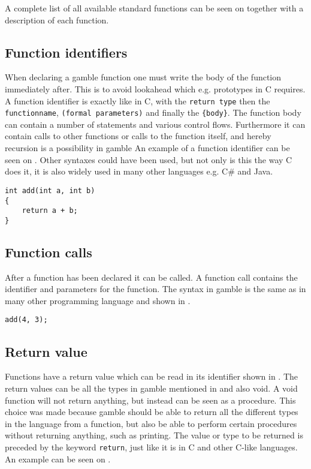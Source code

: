A complete list of all available standard functions can be seen on  together with a description of each function.


\subsection*{Function identifiers}
When declaring a \gls{gamble} function one must write the body of the function immediately after.
This is to avoid lookahead which e.g. prototypes in C requires.
A function identifier is exactly like in C, with the \texttt{return type} then the \texttt{functionname}, \texttt{(formal parameters)} and finally the \texttt{\{body\}}. %
The function body can contain a number of statements and various control flows.
Furthermore it can contain calls to other functions or calls to the function itself, and hereby recursion is a possibility in \gls{gamble}
An example of a function identifier can be seen on .
Other syntaxes could have been used, but not only is this the way C does it, it is also widely used in many other languages e.g. C\# and Java.

\begin{lstlisting}[caption={Function Identifier},label={lst:functionID},numbers=none]                                                        
int add(int a, int b)
{
    return a + b;
}
\end{lstlisting}

\subsection*{Function calls}
After a function has been declared it can be called. 
A function call contains the identifier and parameters for the function. 
The syntax in \gls{gamble} is the same as in many other programming language and shown in . 

\begin{lstlisting}[caption={A function call in \gls{gamble}},label={lst:functionCall},numbers=none]
add(4, 3);
\end{lstlisting}


\subsection*{Return value}
Functions have a return value which can be read in its identifier shown in .
The return values can be all the types in \gls{gamble} mentioned in  and also void. 
A void function will not return anything, but instead can be seen as a procedure.
This choice was made because \gls{gamble} should be able to return all the different types in the language from a function, but also be able to perform certain procedures without returning anything, such as printing.
The value or type to be returned is preceded by the keyword \texttt{return}, just like it is in C and other C-like languages.
An example can be seen on .

